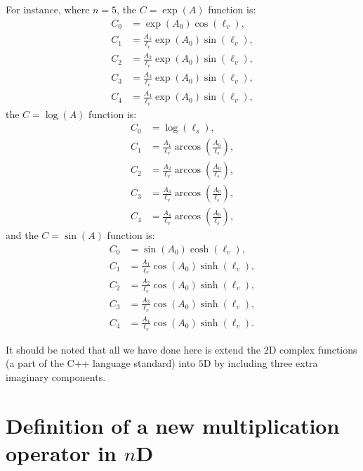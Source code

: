 \documentclass[12pt]{article}
\begin{document}
For instance, where $n = 5$, the $C = \exp(A)$ function is:
\begin{equation}
\begin{split}
C_0 &= \exp(A_0) \cos(\ell_v), \\
C_1 &= \frac{A_1}{\ell_v} \exp(A_0) \sin(\ell_v), \\
C_2 &= \frac{A_2}{\ell_v} \exp(A_0) \sin(\ell_v), \\
C_3 &= \frac{A_3}{\ell_v} \exp(A_0) \sin(\ell_v), \\
C_4 &= \frac{A_4}{\ell_v} \exp(A_0) \sin(\ell_v),
\end{split}
\end{equation}
the $C = \log(A)$ function is:
\begin{equation}
\begin{split}
C_0 &= \log(\ell_s), \\
C_1 &= \frac{A_1}{\ell_v} \arccos\left( \frac{A_0}{\ell_s} \right), \\
C_2 &= \frac{A_2}{\ell_v} \arccos\left( \frac{A_0}{\ell_s} \right), \\
C_3 &= \frac{A_3}{\ell_v} \arccos\left( \frac{A_0}{\ell_s} \right), \\
C_4 &= \frac{A_4}{\ell_v} \arccos\left( \frac{A_0}{\ell_s} \right),
\end{split}
\end{equation}
and the $C = \sin(A)$ function is:
\begin{equation}
\begin{split}
C_0 &= \sin(A_0) \cosh(\ell_v), \\
C_1 &= \frac{A_1}{\ell_v} \cos(A_0) \sinh(\ell_v), \\
C_2 &= \frac{A_2}{\ell_v} \cos(A_0) \sinh(\ell_v), \\
C_3 &= \frac{A_3}{\ell_v} \cos(A_0) \sinh(\ell_v), \\
C_4 &= \frac{A_4}{\ell_v} \cos(A_0) \sinh(\ell_v).
\end{split}
\end{equation}

It should be noted that all we have done here is extend the $2$D complex functions (a part of the C++ language standard) into $5$D by including three extra imaginary components.








\section{Definition of a new multiplication operator in $n$D}
\end{document}
